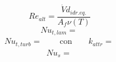 \documentclass[a4paper,10pt]{article}                                                                                       %
\begin{document}
\begin{equation}                                                                                                            %
  Re_{alt} = \frac{\dot{V}d_{idr.eq.}}{A_f\nu(T)}                                                                           %
  \label{eqn:re_alt}                                                                                                        %
\end{equation}                                                                                                              %
\begin{equation}                                                                                                            %
  Nu_{t,lam} = \frac{}{}                                                                          %
  \label{eqn:nu_pipe_l}                                                                                                     %
\end{equation}                                                                                                              %
\begin{equation}                                                                                                            %
  Nu_{t,turb} = \frac{}{}                                                                         %
  \qquad\text{con}\qquad                                                                                                    %
  k_{attr} = \frac{}{}                                                                            %
  \label{eqn:nu_pipe_t}                                                                                                     %
\end{equation}                                                                                                              %
\begin{equation}                                                                                                            %
  Nu_s = \frac{}{}                                                                                %
  \label{eqn:nu_shell}                                                                                                      %
\end{equation}                                                                                                              %
\end{document}
